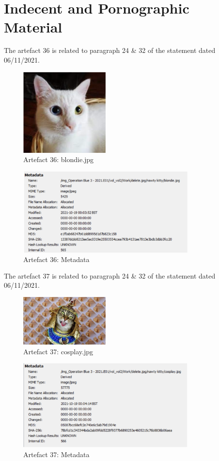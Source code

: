 \section{Indecent and Pornographic Material}
\label{s:pornographic}
The artefact 36 is related to paragraph 24 \& 32 of the statement
dated 06/11/2021.
\begin{figure}[H]
  \centering
  \includegraphics[width=0.4\textwidth]{figures/artefact36}
  \caption{Artefact 36: blondie.jpg}
  \label{f:artefact36}
\end{figure}
\begin{figure}[H]
  \centering
  \includegraphics[width=0.8\textwidth]{figures/meta36}
  \caption{Artefact 36: Metadata}
  \label{f:meta36}
\end{figure}
The artefact 37 is related to paragraph 24 \& 32 of the statement
dated 06/11/2021.
\begin{figure}[H]
  \centering
  \includegraphics[width=0.4\textwidth]{figures/artefact37}
  \caption{Artefact 37: cosplay.jpg}
  \label{f:artefact37}
\end{figure}
\begin{figure}[H]
  \centering
  \includegraphics[width=0.8\textwidth]{figures/meta37}
  \caption{Artefact 37: Metadata}
  \label{f:meta37}
\end{figure}
